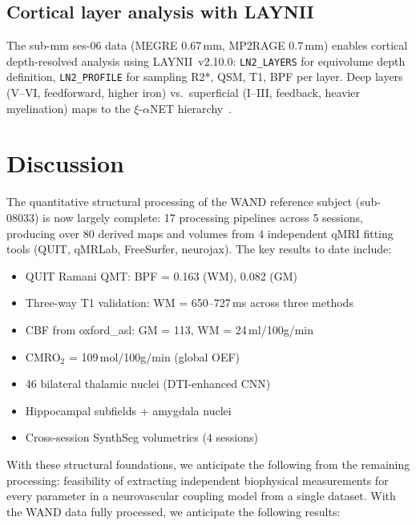 \documentclass[11pt,a4paper]{article}\usepackage[]{graphicx}\usepackage[]{xcolor}
\begin{document}
\subsection{Cortical layer analysis with LAYNII}

The sub-mm ses-06 data (MEGRE 0.67\,mm, MP2RAGE 0.7\,mm) enables
cortical depth-resolved analysis using LAYNII~v2.10.0:
\texttt{LN2\_LAYERS} for equivolume depth definition,
\texttt{LN2\_PROFILE} for sampling R2*, QSM, T1, BPF per layer.
Deep layers (V--VI, feedforward, higher iron) vs.\ superficial
(I--III, feedback, heavier myelination) maps to the
$\xi$-$\alpha$NET hierarchy~\citep{ValdesSosa2026xialphanet}.

\section{Discussion}

The quantitative structural processing of the WAND reference subject
(sub-08033) is now largely complete: 17 processing pipelines across
5 sessions, producing over 80 derived maps and volumes from 4 independent
qMRI fitting tools (QUIT, qMRLab, FreeSurfer, neurojax). The key results
to date include:

\begin{itemize}
  \item QUIT Ramani QMT: BPF = 0.163 (WM), 0.082 (GM)
  \item Three-way T1 validation: WM = 650--727\,ms across three methods
  \item CBF from oxford\_asl: GM = 113, WM = 24\,ml/100g/min
  \item CMRO$_2$ = 109\,\textmu mol/100g/min (global OEF)
  \item 46 bilateral thalamic nuclei (DTI-enhanced CNN)
  \item Hippocampal subfields + amygdala nuclei
  \item Cross-session SynthSeg volumetrics (4 sessions)
\end{itemize}

\noindent With these structural foundations, we anticipate the following
from the remaining processing:
feasibility of extracting independent biophysical measurements for every
parameter in a neurovascular coupling model from a single dataset. With
the WAND data fully processed, we anticipate the following results:
\end{document}
